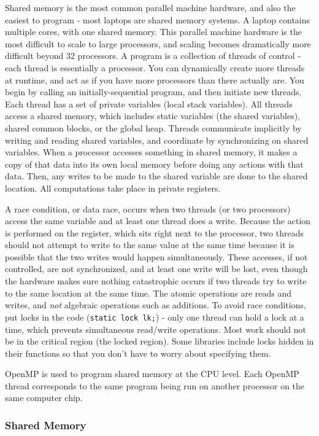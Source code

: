 \documentclass[10pt]{article}
\begin{document}
\begin{flushleft}
Shared memory is the most common parallel machine hardware, and also the easiest to program - most laptops are shared memory systems. A laptop contains multiple cores, with one shared memory. This parallel machine hardware is the most difficult to scale to large processors, and scaling becomes dramatically more difficult beyond 32 processors. A program is a collection of threads of control - each thread is essentially a processor. You can dynamically create more threads at runtime, and act as if you have more processors than there actually are. You begin by calling an initially-sequential program, and then initiate new threads. Each thread has a set of private variables (local stack variables). All threads access a shared memory, which includes static variables (the shared variables), shared common blocks, or the global heap. Threads communicate implicitly by writing and reading shared variables, and coordinate by synchronizing on shared variables. When a processor accesses something in shared memory, it makes a copy of that data into its own local memory before doing any actions with that data. Then, any writes to be made to the shared variable are done to the shared location. All computations take place in private registers.

A race condition, or data race, occurs when two threads (or two processors) access the same variable and at least one thread does a write. Because the action is performed on the register, which sits right next to the processor, two threads should not attempt to write to the same value at the same time because it is possible that the two writes would happen simultaneously. These accesses, if not controlled, are not synchronized, and at least one write will be lost, even though the hardware makes sure nothing catastrophic occurs if two threads try to write to the same location at the same time. The atomic operations are reads and writes, and \textit{not} algebraic operations such as additions. To avoid race conditions, put locks in the code ({\tt static lock lk;}) - only one thread can hold a lock at a time, which prevents simultaneous read/write operations. Most work should not be in the critical region (the locked region). Some libraries include locks hidden in their functions so that you don't have to worry about specifying them.

OpenMP is used to program shared memory at the CPU level. Each OpenMP thread corresponds to the same program being run on another processor on the same computer chip.

\subsubsection{Shared Memory}


\end{flushleft}
\end{document}
